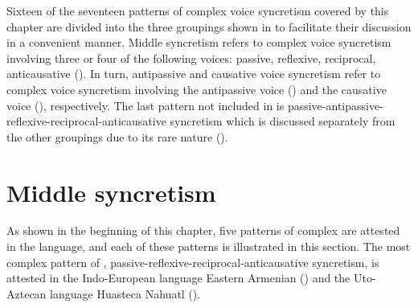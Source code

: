 Sixteen of the seventeen patterns of complex voice syncretism covered by this chapter are divided into the three groupings shown in  to facilitate their discussion in a convenient manner. Middle syncretism refers to complex voice syncretism involving three or four of the following voices: passive, reflexive, reciprocal, anticausative (). In turn, antipassive and causative voice syncretism refer to complex voice syncretism involving the antipassive voice () and the causative voice (), respectively. The last pattern not included in  is passive-antipassive-reflexive-reciprocal-anticausative syncretism which is discussed separately from the other groupings due to its rare nature ().

\section{Middle syncretism} \label{sec:complex-syncretism:middle}
As shown in the beginning of this chapter, five patterns of complex  are attested in the language, and each of these patterns is illustrated in this section. The most complex pattern of , passive-reflexive-reciprocal-anticausative syncretism, is attested in the Indo-European language Eastern Armenian () and the Uto-Aztecan language Huasteca Nahuatl ().

